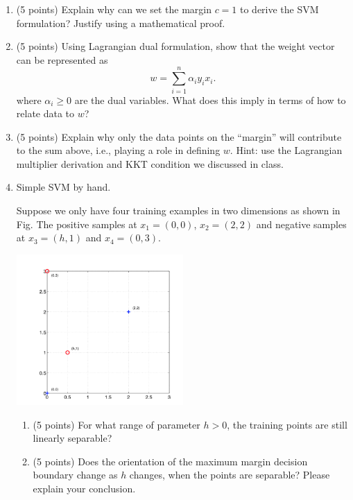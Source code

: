\documentclass[twoside,10pt]{article}
\begin{document}
\begin{enumerate}
\item (5 points) Explain why can we set the margin $c = 1$ to derive the SVM formulation? Justify using a mathematical proof.
\item (5 points) Using Lagrangian dual formulation, show that the weight vector can be represented as
\[
w = \sum_{i=1}^n \alpha_i y_i x_i.
\]
where $\alpha_i \geq 0$ are the dual variables. What does this imply in terms of how to relate data to $w$?
\item (5 points) Explain why only the data points on the ``margin'' will contribute to the sum above, i.e., playing a role in defining $w$. Hint: use the Lagrangian multiplier derivation and KKT condition we discussed in class. 

\item Simple SVM by hand. 

Suppose we only have four training examples in two dimensions as shown in Fig. The positive samples at $x_1 = (0, 0)$, $x_2 = (2, 2)$ and negative samples at $x_3 = (h, 1)$ and $x_4 = (0, 3)$. 
%
\begin{center}
\includegraphics[width = 0.5\textwidth]{svm}
\end{center}

\begin{enumerate}
\item (5 points) For what range of parameter $h > 0$, the training points are still linearly separable?



\item (5 points) Does the orientation of the maximum margin decision boundary change as $h$ changes, when the points are separable? Please explain your conclusion.
\end{enumerate}


\end{enumerate}
\end{document}
